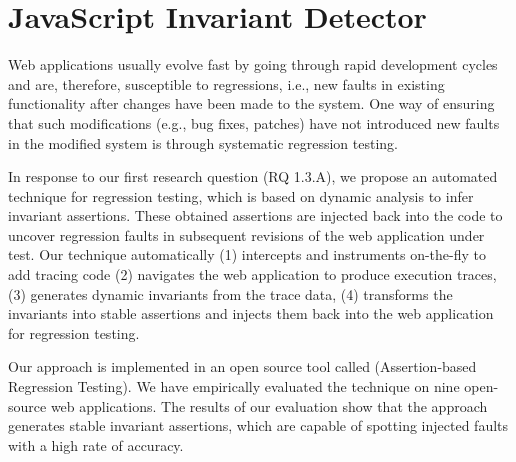 \chapter{JavaScript Invariant Detector}
\label{Chap:jsart}
Web applications usually evolve fast by going through rapid development cycles and are, therefore, susceptible to regressions, i.e., new faults in existing functionality after changes have been made to the system. One way of ensuring that such modifications (e.g., bug fixes, patches) have not introduced new faults in the modified system is through systematic regression testing.

In response to our first research question (RQ 1.3.A), we propose \cite{mirshokraie:icwe12} an automated technique for \javascript regression testing, which is based on dynamic analysis to infer invariant assertions. These obtained assertions are injected back into the \javascript code to uncover regression faults in subsequent revisions of the web application under test. 
Our technique automatically (1) intercepts and instruments \javascript on-the-fly to add tracing code (2) navigates the web application to produce execution traces, (3) generates dynamic invariants from the trace data, (4) transforms the invariants into stable assertions and injects them back into the web application for regression testing.

Our approach is implemented in an open source tool called \jsart (\javascript Assertion-based Regression Testing).  We have empirically
evaluated the technique on nine open-source web applications. The results of our evaluation show that the approach generates stable invariant assertions, which are capable of spotting injected faults with a high rate of accuracy.





%
%